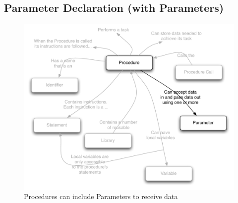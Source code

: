 \clearpage
\subsection{Parameter Declaration (with Parameters)} %
\label{sub:parameter_declaration_with_parameters_}

\begin{figure}[h]
   \centering
   \includegraphics[width=\textwidth]{./topics/parameters/diagrams/ProcedureDecl} 
   \caption{Procedures can include Parameters to receive data}
   \label{fig:parameters-procedure-decl}
\end{figure}

